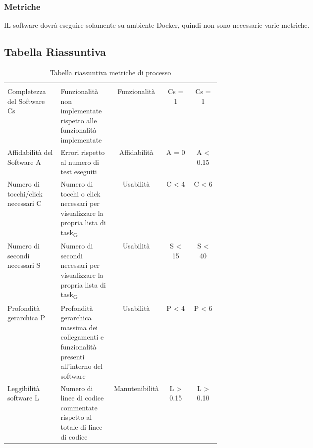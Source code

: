 \subsubsection{Metriche}
IL software dovrà eseguire solamente su ambiente Docker, quindi non sono necessarie varie metriche.
\subsection{Tabella Riassuntiva}
\begin{table}[H]
	\begin{center}
		\caption{Tabella riassuntiva metriche di processo}
		\begin{tabular}{p{0.25\linewidth} p{0.25\linewidth}c!{\color[HTML]{9b240a}\vrule width 0.05cm}cc}
			\rowcolorhead
			         &                                                                            &  &  &  \\

			Completezza del Software Cs        & Funzionalità non implementate rispetto alle funzionalità implementate                               & Funzionalità                & Cs = 1                   & Cs = 1                     \\
			Affidabilità del Software A        & Errori rispetto al numero di test eseguiti                                                          & Affidabilità                & A = 0                    & A < 0.15                   \\
			Numero di tocchi/click necessari C & Numero di tocchi o click necessari per visualizzare la propria lista di \gls{task}\textsubscript{G} & Usabilità                   & C < 4                    & C < 6                      \\
			Numero di secondi necessari S      & Numero di secondi necessari per visualizzare la propria lista di \gls{task}\textsubscript{G}        & Usabilità                   & S < 15                   & S < 40                     \\
			Profondità gerarchica P            & Profondità gerarchica massima dei collegamenti e funzionalità presenti all'interno del software     & Usabilità                   & P < 4                    & P < 6                      \\
			Leggibilità software L             & Numero di linee di codice commentate rispetto al totale di linee di codice                          & Manutenibilità              & L > 0.15                 & L > 0.10                   \\
		\end{tabular}

	\end{center}
\end{table}
